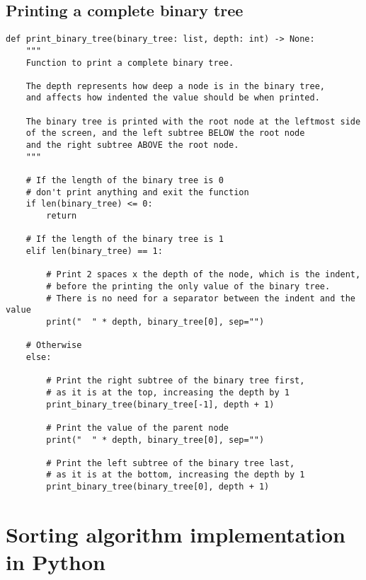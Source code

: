 \documentclass[11pt]{article}
\begin{document}
 \newpage

\subsection{Printing a complete binary tree}
\label{sec:org2276a57}
\begin{verbatim}
def print_binary_tree(binary_tree: list, depth: int) -> None:
    """
    Function to print a complete binary tree.

    The depth represents how deep a node is in the binary tree,
    and affects how indented the value should be when printed.

    The binary tree is printed with the root node at the leftmost side
    of the screen, and the left subtree BELOW the root node
    and the right subtree ABOVE the root node.
    """

    # If the length of the binary tree is 0
    # don't print anything and exit the function
    if len(binary_tree) <= 0:
        return

    # If the length of the binary tree is 1
    elif len(binary_tree) == 1:

        # Print 2 spaces x the depth of the node, which is the indent,
        # before the printing the only value of the binary tree.
        # There is no need for a separator between the indent and the value
        print("  " * depth, binary_tree[0], sep="")

    # Otherwise
    else:

        # Print the right subtree of the binary tree first,
        # as it is at the top, increasing the depth by 1
        print_binary_tree(binary_tree[-1], depth + 1)

        # Print the value of the parent node
        print("  " * depth, binary_tree[0], sep="")

        # Print the left subtree of the binary tree last,
        # as it is at the bottom, increasing the depth by 1
        print_binary_tree(binary_tree[0], depth + 1)
\end{verbatim}

 \newpage

\section{Sorting algorithm implementation in Python}
\label{sec:orgb97fb6c}
\end{document}

